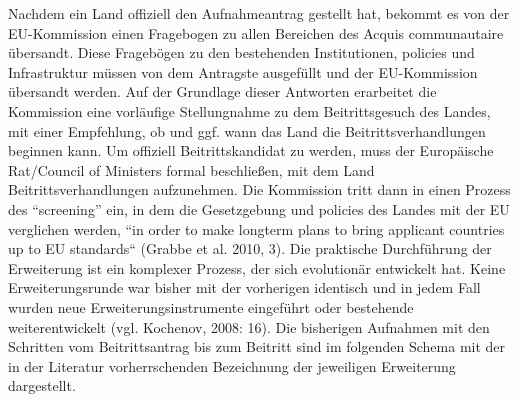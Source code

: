 Nachdem ein Land offiziell den Aufnahmeantrag gestellt hat, bekommt es von der EU-Kommission einen Fragebogen zu allen Bereichen des Acquis communautaire übersandt. Diese Fragebögen zu den bestehenden Institutionen, policies und Infrastruktur müssen von dem Antragste
 ausgefüllt und der EU-Kommission übersandt werden. Auf der Grundlage dieser Antworten erarbeitet die Kommission eine vorläufige Stellungnahme zu dem Beitrittsgesuch des Landes, mit einer Empfehlung, ob und ggf. wann das Land die Beitrittsverhandlungen beginnen kann. Um offiziell Beitrittskandidat zu werden, muss der Europäische Rat/Council of Ministers formal beschließen, mit dem Land Beitrittsverhandlungen aufzunehmen. Die Kommission tritt dann in einen Prozess des “screening” ein, in dem die Gesetzgebung und policies des Landes mit der EU verglichen werden, “in order to make longterm plans to bring applicant countries up to EU standards“ (Grabbe et al. 2010, 3).
Die praktische Durchführung der Erweiterung ist ein komplexer Prozess, der sich evolutionär entwickelt hat. Keine Erweiterungsrunde war bisher mit der vorherigen identisch und in jedem Fall wurden neue Erweiterungsinstrumente eingeführt oder bestehende weiterentwickelt (vgl. Kochenov, 2008: 16). Die bisherigen Aufnahmen mit den Schritten vom Beitrittsantrag bis zum Beitritt sind im folgenden Schema mit der in der Literatur vorherrschenden Bezeichnung der jeweiligen Erweiterung dargestellt.\\
